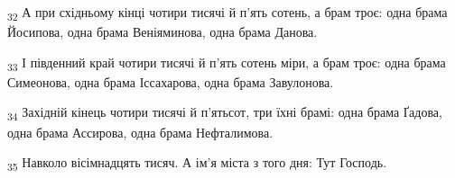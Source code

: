 \begin{tcolorbox}
\textsubscript{32} А при східньому кінці чотири тисячі й п'ять сотень, а брам троє: одна брама Йосипова, одна брама Веніяминова, одна брама Данова.
\end{tcolorbox}
\begin{tcolorbox}
\textsubscript{33} І південний край чотири тисячі й п'ять сотень міри, а брам троє: одна брама Симеонова, одна брама Іссахарова, одна брама Завулонова.
\end{tcolorbox}
\begin{tcolorbox}
\textsubscript{34} Західній кінець чотири тисячі й п'ятьсот, три їхні брамі: одна брама Ґадова, одна брама Ассирова, одна брама Нефталимова.
\end{tcolorbox}
\begin{tcolorbox}
\textsubscript{35} Навколо вісімнадцять тисяч. А ім'я міста з того дня: Тут Господь.
\end{tcolorbox}

